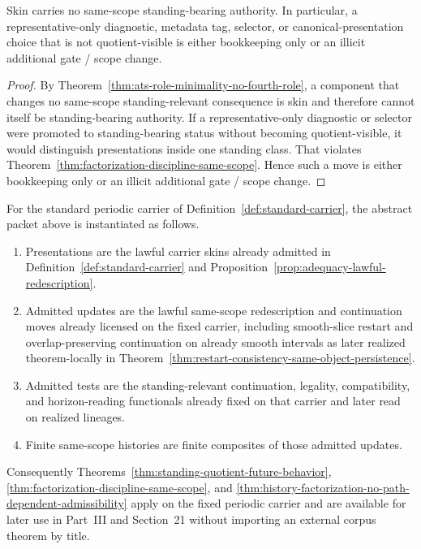 \begin{corollary}\label{cor:skin-non-authority-representative-diagnostics}
Skin carries no same-scope standing-bearing authority. In particular, a representative-only diagnostic, metadata tag, selector, or canonical-presentation choice that is not quotient-visible is either bookkeeping only or an illicit additional gate / scope change.
\end{corollary}

\begin{proof}
By Theorem~\ref{thm:ats-role-minimality-no-fourth-role}, a component that changes no same-scope standing-relevant consequence is skin and therefore cannot itself be standing-bearing authority. If a representative-only diagnostic or selector were promoted to standing-bearing status without becoming quotient-visible, it would distinguish presentations inside one standing class. That violates Theorem~\ref{thm:factorization-discipline-same-scope}. Hence such a move is either bookkeeping only or an illicit additional gate / scope change.
\end{proof}

\begin{proposition}\label{prop:periodic-carrier-interface-quotient-history}
For the standard periodic carrier of Definition~\ref{def:standard-carrier}, the abstract packet above is instantiated as follows.
\begin{enumerate}[label=(\roman*), leftmargin=2.2em]
\item Presentations are the lawful carrier skins already admitted in Definition~\ref{def:standard-carrier} and Proposition~\ref{prop:adequacy-lawful-redescription}.
\item Admitted updates are the lawful same-scope redescription and continuation moves already licensed on the fixed carrier, including smooth-slice restart and overlap-preserving continuation on already smooth intervals as later realized theorem-locally in Theorem~\ref{thm:restart-consistency-same-object-persistence}.
\item Admitted tests are the standing-relevant continuation, legality, compatibility, and horizon-reading functionals already fixed on that carrier and later read on realized lineages.
\item Finite same-scope histories are finite composites of those admitted updates.
\end{enumerate}
Consequently Theorems~\ref{thm:standing-quotient-future-behavior}, \ref{thm:factorization-discipline-same-scope}, and \ref{thm:history-factorization-no-path-dependent-admissibility} apply on the fixed periodic carrier and are available for later use in Part~III and Section~21 without importing an external corpus theorem by title.
\end{proposition}

